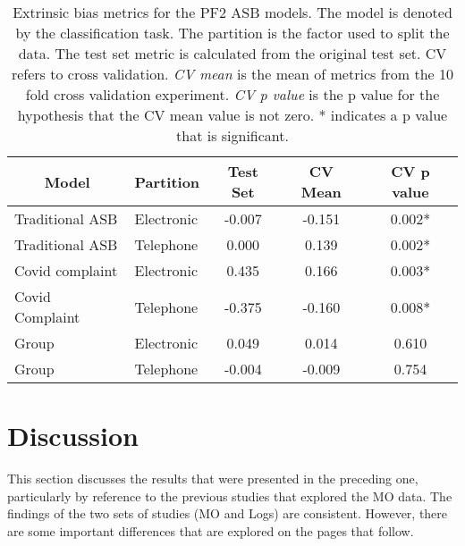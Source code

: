 \begin{table}[]
\begin{tabular}{@{}llccc@{}}
\multicolumn{1}{c}{Model} & \multicolumn{1}{c}{Partition} & Test Set & CV Mean & CV p value \\ \midrule
Traditional ASB                                   & Electronic                                            & -0.007   & -0.151  & 0.002*      \\
Traditional ASB                                   & Telephone                                             & 0.000    & 0.139   & 0.002*      \\
Covid complaint                                   & Electronic                                            & 0.435    & 0.166   & 0.003*      \\
Covid Complaint                                   & Telephone                                             & -0.375   & -0.160  & 0.008*      \\
Group                                         & Electronic                                            & 0.049    & 0.014   & 0.610      \\
Group                                         & Telephone                                             & -0.004   & -0.009  & 0.754      \\ \bottomrule
\end{tabular}
\caption[ASB incident logs Bias Table]{\label{tab:asb_bias} Extrinsic bias metrics for the PF2 ASB models. The model is denoted by the classification task. The partition is the factor used to split the data. The test set metric is calculated from the original test set. CV refers to cross validation. \emph{CV mean} is the mean of metrics from the 10 fold cross validation experiment. \emph{CV p value} is the p value for the hypothesis that the CV mean value is not zero. * indicates a p value that is significant.}
\end{table}

\section{Discussion} This section discusses the results that were presented in the preceding one, particularly by reference to the previous studies that explored the MO data. The findings of the two sets of studies (MO and Logs) are consistent. However, there are some important differences that are explored on the pages that follow.

